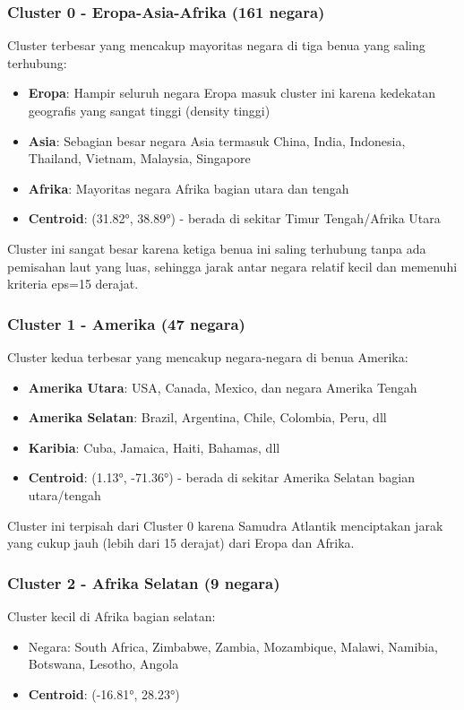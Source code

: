 \documentclass[12pt,a4paper]{article}
\begin{document}
\subsubsection{Cluster 0 - Eropa-Asia-Afrika (161 negara)}
Cluster terbesar yang mencakup mayoritas negara di tiga benua yang saling terhubung:
\begin{itemize}
    \item \textbf{Eropa}: Hampir seluruh negara Eropa masuk cluster ini karena kedekatan geografis yang sangat tinggi (density tinggi)
    \item \textbf{Asia}: Sebagian besar negara Asia termasuk China, India, Indonesia, Thailand, Vietnam, Malaysia, Singapore
    \item \textbf{Afrika}: Mayoritas negara Afrika bagian utara dan tengah
    \item \textbf{Centroid}: (31.82°, 38.89°) - berada di sekitar Timur Tengah/Afrika Utara
\end{itemize}

Cluster ini sangat besar karena ketiga benua ini saling terhubung tanpa ada pemisahan laut yang luas, sehingga jarak antar negara relatif kecil dan memenuhi kriteria eps=15 derajat.

\subsubsection{Cluster 1 - Amerika (47 negara)}
Cluster kedua terbesar yang mencakup negara-negara di benua Amerika:
\begin{itemize}
    \item \textbf{Amerika Utara}: USA, Canada, Mexico, dan negara Amerika Tengah
    \item \textbf{Amerika Selatan}: Brazil, Argentina, Chile, Colombia, Peru, dll
    \item \textbf{Karibia}: Cuba, Jamaica, Haiti, Bahamas, dll
    \item \textbf{Centroid}: (1.13°, -71.36°) - berada di sekitar Amerika Selatan bagian utara/tengah
\end{itemize}

Cluster ini terpisah dari Cluster 0 karena Samudra Atlantik menciptakan jarak yang cukup jauh (lebih dari 15 derajat) dari Eropa dan Afrika.

\subsubsection{Cluster 2 - Afrika Selatan (9 negara)}
Cluster kecil di Afrika bagian selatan:
\begin{itemize}
    \item Negara: South Africa, Zimbabwe, Zambia, Mozambique, Malawi, Namibia, Botswana, Lesotho, Angola
    \item \textbf{Centroid}: (-16.81°, 28.23°)
\end{itemize}
\end{document}
